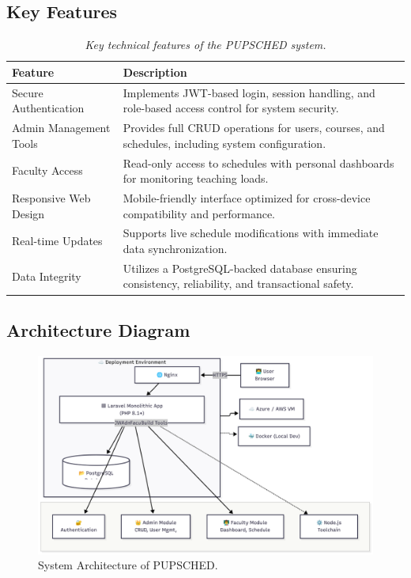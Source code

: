 \documentclass[12pt,letterpaper]{article}
\begin{document}
\subsection{Key Features}
\begin{table}[h] 
\centering
\renewcommand{\arraystretch}{1.3} 
\setlength{\tabcolsep}{25pt}      
\begin{tabular}{|p{4cm}|p{9cm}|}
\hline
\textbf{Feature} & \textbf{Description} \\
\hline
Secure Authentication & Implements JWT-based login, session handling, and role-based access control for system security. \\
\hline
Admin Management Tools & Provides full CRUD operations for users, courses, and schedules, including system configuration. \\
\hline
Faculty Access & Read-only access to schedules with personal dashboards for monitoring teaching loads. \\
\hline
Responsive Web Design & Mobile-friendly interface optimized for cross-device compatibility and performance. \\
\hline
Real-time Updates & Supports live schedule modifications with immediate data synchronization. \\
\hline
Data Integrity & Utilizes a PostgreSQL-backed database ensuring consistency, reliability, and transactional safety. \\
\hline
\end{tabular}
\caption{\textit{Key technical features of the PUPSCHED system.}}
\end{table}



\vspace{4.5em} 

\subsection{Architecture Diagram}

\begin{figure}[h!]
    \centering
    \includegraphics[width=\textwidth]{assets/architecture_dia_pupsched.png}
    \caption{System Architecture of PUPSCHED.}
    \label{fig:architecture}
\end{figure}
\end{document}
